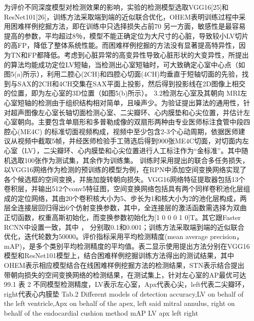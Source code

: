 为评价不同深度模型对检测效果的影响，实验的检测模型选取VGG16[25]和ResNet101[26]，训练方法采取端到端的近似联合优化，OHEM表明训练过程中采用困难样例挖掘方法，即在训练中只选择损失占前70%
另一方面，敏感性是最容易提高的参数，平均超过8％，模型不能正确定位为大尺寸的心脏，导致较小LV切片的高FP，降低了整体系统性能。而困难样例挖掘的方法没有显著提高特异性，因为TN和FP都降低。考虑到心脏异常的高变异性导致心脏形状的大变异性，所提出的算法均能成功定位LV短轴，当检测出心室短轴时，可大致确定心室中心点（如图5(a)所示），利用二腔心(2CH)和四腔心切面(4CH)均垂直于短轴切面的先验，找到与SAX的2CH和4CH交集在SAX平面上投影，然后得到投影线在2D图像上相交的位置，即为左心室的3D位置（如图5(b)所示）。
3.2检测左心室及其朝向
MRI左心室短轴的检测由于组织结构相对简单，且噪声少。为验证提出算法的通用性，针对超声图像左心室长轴切面检测心室、二尖瓣环、心内膜垫和心尖位置，并估计左心室朝向。主要包含单扇形和多普勒成像的双扇形两种由专业医师标注食管中段四腔心(ME4C) 的标准切面视频构成，视频中至少包含2-3个心动周期，依据医师建议从视频中截取5帧，并经医师检验手工筛选后得到900张ME4C切面，对切面内左心室（LV），二尖瓣环、心内膜垫和心尖位置进行人工标注作为“金标准”。其中随机选取100张作为测试集，其余作为训练集。
训练时采用提出的联合多任务损失，以VGG16网络作为检测的预训练的模型为例，在RPN中添加空间变换网络实现了各个候选框的空间变换，并施加旋转朝向损失。VGG16网络特征提取器包括13个卷积层，并输出512个conv5特征图，空间变换网络包括具有两个同样卷积池化层组成的定位网络，其由20个卷积核大小为5、步长为1和核大小为2的池化层构成，两层全连接层回归得出6个仿射变换参数，其中，全连接层的激活函数需选择为双曲正切函数，权重高斯初始化，而变换参数初始化为[1 0 0 0 1 0]T。其它跟Faster RCNN中设置一致，其中 ， 分别取0.1和0.001；训练方法采取端到端的近似联合优化，迭代轮数为50000。评价指标采用平均检测精度(mean average precision，mAP)，是多个类别平均检测精度的平均值。表二显示使用提出方法分别在VGG16模型和ResNet101模型上，结合困难样例挖掘训练方法得出的测试结果，其中OHEM表示相应模型结合在线困难样例挖掘方法的检测结果，STN表示结合提出带朝向损失的空间变换网络的检测结果，在测试集上，针对左心室的AP最优可达99.1%
表 2 不同模型检测精度，LV表示左心室，Apx代表心尖，left代表二尖瓣环，right代表心内膜垫
Tab.2 Different models of detection accuracy,LV on behalf of the left ventricle,Apx on behalf of the apex, left said mitral annulus, right on behalf of the endocardial cushion
method                        mAP             LV               apx              left              right       


